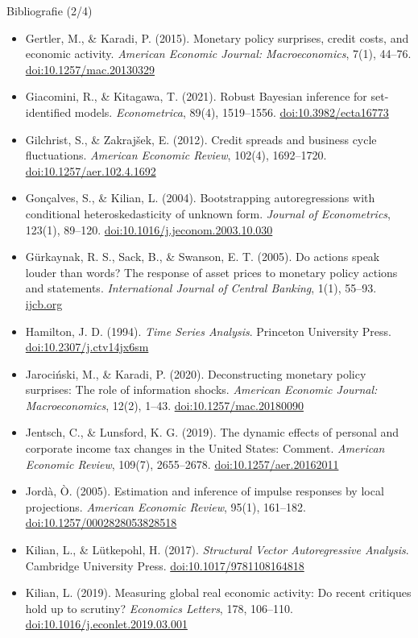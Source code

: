 \begin{frame}{Bibliografie (2/4)}
\itemsize{\tiny}
\begin{itemize}
    \item Gertler, M., \& Karadi, P. (2015). Monetary policy surprises, credit costs, and economic activity. \textit{American Economic Journal: Macroeconomics}, 7(1), 44--76. \href{https://doi.org/10.1257/mac.20130329}{doi:10.1257/mac.20130329}
    \item Giacomini, R., \& Kitagawa, T. (2021). Robust Bayesian inference for set-identified models. \textit{Econometrica}, 89(4), 1519--1556. \href{https://doi.org/10.3982/ecta16773}{doi:10.3982/ecta16773}
    \item Gilchrist, S., \& Zakrajšek, E. (2012). Credit spreads and business cycle fluctuations. \textit{American Economic Review}, 102(4), 1692--1720. \href{https://doi.org/10.1257/aer.102.4.1692}{doi:10.1257/aer.102.4.1692}
    \item Gonçalves, S., \& Kilian, L. (2004). Bootstrapping autoregressions with conditional heteroskedasticity of unknown form. \textit{Journal of Econometrics}, 123(1), 89--120. \href{https://doi.org/10.1016/j.jeconom.2003.10.030}{doi:10.1016/j.jeconom.2003.10.030}
    \item Gürkaynak, R. S., Sack, B., \& Swanson, E. T. (2005). Do actions speak louder than words? The response of asset prices to monetary policy actions and statements. \textit{International Journal of Central Banking}, 1(1), 55--93. \href{https://www.ijcb.org/journal/ijcb05q2a2.htm}{ijcb.org}
    \item Hamilton, J. D. (1994). \textit{Time Series Analysis}. Princeton University Press. \href{https://doi.org/10.2307/j.ctv14jx6sm}{doi:10.2307/j.ctv14jx6sm}
    \item Jarociński, M., \& Karadi, P. (2020). Deconstructing monetary policy surprises: The role of information shocks. \textit{American Economic Journal: Macroeconomics}, 12(2), 1--43. \href{https://doi.org/10.1257/mac.20180090}{doi:10.1257/mac.20180090}
    \item Jentsch, C., \& Lunsford, K. G. (2019). The dynamic effects of personal and corporate income tax changes in the United States: Comment. \textit{American Economic Review}, 109(7), 2655--2678. \href{https://doi.org/10.1257/aer.20162011}{doi:10.1257/aer.20162011}
    \item Jordà, Ò. (2005). Estimation and inference of impulse responses by local projections. \textit{American Economic Review}, 95(1), 161--182. \href{https://doi.org/10.1257/0002828053828518}{doi:10.1257/0002828053828518}
    \item Kilian, L., \& Lütkepohl, H. (2017). \textit{Structural Vector Autoregressive Analysis}. Cambridge University Press. \href{https://doi.org/10.1017/9781108164818}{doi:10.1017/9781108164818}
    \item Kilian, L. (2019). Measuring global real economic activity: Do recent critiques hold up to scrutiny? \textit{Economics Letters}, 178, 106--110. \href{https://doi.org/10.1016/j.econlet.2019.03.001}{doi:10.1016/j.econlet.2019.03.001}
\end{itemize}
\end{frame}

